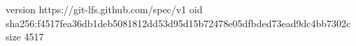 version https://git-lfs.github.com/spec/v1
oid sha256:f4517fea36db1deb5081812dd53d95d15b72478e05dfbded73ead9dc4bb7302c
size 4517
